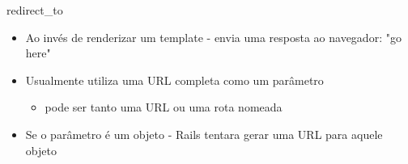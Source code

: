\begin{frame}[t, fragile]{redirect\_to}
	\begin{itemize}
		\item Ao invés de renderizar um template - \alert{envia uma resposta} ao navegador:
			"go here" 
		\item Usualmente \alert{utiliza uma URL completa} como um parâmetro
		\begin{itemize}	
			\item pode ser tanto uma URL ou uma rota nomeada
		\end{itemize}	
		\item Se o parâmetro é um objeto - Rails tentara \alert{gerar uma URL} para aquele objeto
	\end{itemize}	
\end{frame}